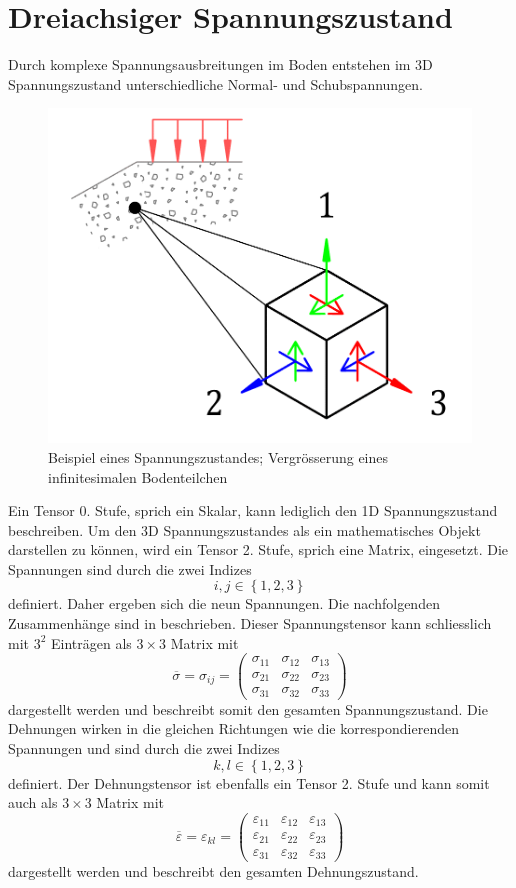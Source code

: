 \section{Dreiachsiger Spannungszustand\label{spannung:section:Dreiachsiger_Spannungszustand}}
Durch komplexe Spannungsausbreitungen im Boden entstehen im 3D Spannungszustand unterschiedliche Normal- und Schubspannungen.
\begin{figure}
	\centering
	\includegraphics[width=0.4\linewidth,keepaspectratio]{papers/spannung/Grafiken/infinitesimalerWuerfel.png}
	\caption{Beispiel eines Spannungszustandes; Vergrösserung eines infinitesimalen Bodenteilchen}
	\label{fig:infinitesimalerWuerfel}
\end{figure}
Ein Tensor 0. Stufe, sprich ein Skalar, kann lediglich den 1D Spannungszustand beschreiben.
Um den 3D Spannungszustandes als ein mathematisches Objekt darstellen zu können, wird ein Tensor 2. Stufe, sprich eine Matrix, eingesetzt.
Die Spannungen sind durch die zwei Indizes
\[
i, j\in\left\{1, 2, 3\right\}
\]
definiert.
Daher ergeben sich die neun Spannungen.
Die nachfolgenden Zusammenhänge sind in \cite{spannung:Voigtsche-Notation} beschrieben.
Dieser Spannungstensor kann schliesslich mit $3^2$ Einträgen als $3\times3$ Matrix mit
\[
\overline{\sigma}
=
\sigma_{ij}
=
\begin{pmatrix}
	\sigma_{11} & \sigma_{12} & \sigma_{13} \\ 
	\sigma_{21} & \sigma_{22} & \sigma_{23} \\
	\sigma_{31} & \sigma_{32} & \sigma_{33}
\end{pmatrix}
\]
dargestellt werden und beschreibt somit den gesamten Spannungszustand.
Die Dehnungen wirken in die gleichen Richtungen wie die korrespondierenden Spannungen und sind durch die zwei Indizes
\[
k, l\in\left\{1, 2, 3\right\}
\]
definiert.
Der Dehnungstensor ist ebenfalls ein Tensor 2. Stufe und kann somit auch als $3\times3$ Matrix mit
\[
\overline{\varepsilon}
=
\varepsilon_{kl}
=
\begin{pmatrix}
	\varepsilon_{11} & \varepsilon_{12} & \varepsilon_{13} \\ 
	\varepsilon_{21} & \varepsilon_{22} & \varepsilon_{23} \\
	\varepsilon_{31} & \varepsilon_{32} & \varepsilon_{33}
\end{pmatrix}
\]
dargestellt werden und beschreibt den gesamten Dehnungszustand.

